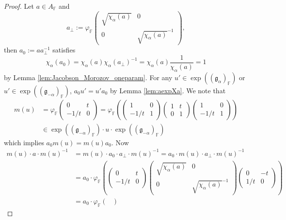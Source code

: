 \documentclass[10pt,a4paper]{amsart}
\newcommand{\F}{\mathbb{F} }
\newcommand{\frakg}{\mathfrak{g}}
\begin{document}
\begin{proof}
	Let $a\in A_\F$ and
	$$
	a_\perp := \varphi_\F \begin{pmatrix}
		\sqrt{\chi_\alpha(a)} & 0 \\ 0 & \sqrt{\chi_\alpha(a)}^{-1}
	\end{pmatrix},
	$$ 
	then $a_0:= aa_\perp^{-1}$ satisfies
	$$
	\chi_\alpha (a_0) = \chi_\alpha(a) \chi_\alpha(a_\perp)^{-1} = \chi_\alpha(a) \frac{1}{\chi_\alpha(a)} = 1 
	$$
	by Lemma \ref{lem:Jacobson_Morozov_oneparam}. For any $u' \in \exp((\frakg_{\alpha})_\F)$ or $u'\in \exp((\frakg_{-\alpha})_\F)$, $a_0u'=u'a_0$ by Lemma \ref{lem:aexpXa}. We note that
	\begin{align*}
			m(u) &= \varphi_\F \begin{pmatrix}
			0 & t \\ -1/t & 0
		\end{pmatrix} =  \varphi_\F \left( \begin{pmatrix}
			1 & 0 \\ -1/t & 1
		\end{pmatrix}  \begin{pmatrix}
			1 & t \\ 0 & 1
		\end{pmatrix} \begin{pmatrix}
			1 & 0 \\ -1/t & 1
		\end{pmatrix}\right) \\
		& \in \exp((\frakg_{-\alpha})_\F) \cdot u \cdot \exp((\frakg_{-\alpha})_\F)
	\end{align*}
	which implies $a_0m(u) = m(u)a_0$. Now
	\begin{align*}
		m(u) \cdot a \cdot m(u)^{-1} &= m(u) \cdot a_0 \cdot a_\perp \cdot m(u)^{-1} = a_0 \cdot m(u) \cdot  a_\perp \cdot m(u)^{-1} \\
		&= a_0 \cdot \varphi_\F \left(\begin{pmatrix}
			0 & t \\ -1/t & 0
		\end{pmatrix}\begin{pmatrix}
		\sqrt{\chi_\alpha(a)} & 0 \\ 0 & \sqrt{\chi_\alpha(a)}^{-1}
		\end{pmatrix}\begin{pmatrix}
		0 & -t \\ 1/t & 0
		\end{pmatrix}\right) \\
		&= a_0\cdot \varphi_\F \begin{pmatrix}

\end{pmatrix}
\end{align*}
\end{proof}
\end{document}
